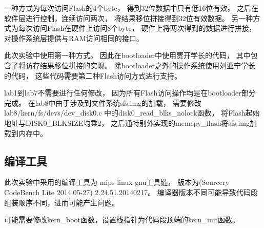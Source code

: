             一种方式为每次访问Flash的4个byte，%
            得到32位数据中只有低16位有效。%
            之后在软件层进行控制，连续访问两次，%
            将结果移位拼接得到32位有效数据。%
            另一种方式为每次访问Flash在硬件上访问8个byte，%
            硬件上将两次得到的数据进行拼接，%
            对操作系统层提供与RAM访问相同的接口。

            此次实验中使用第一种方式。%
            因此在bootloader中使用贾开学长的代码，%
            其中包含了将访存结果移位拼接的实现。%
            除bootloader之外的操作系统使用刘亚宁学长的代码，%
            这些代码需要第二种Flash访问方式进行支持。

            lab1到lab7不需要进行任何修改，%
            因为所有Flash访问操作均是在bootloader部分完成。%
            在lab8中由于涉及到文件系统sfs.img的加载，%
            需要修改lab8/kern/fs/devs/dev\_disk0.c%
            中的disk0\_read\_blks\_nolock函数，%
            将Flash起始地址与DISK0\_BLKSIZE均乘2，%
            之后通特别外实现的memcpy\_flash将sfs.img加载到内存中。

        \subsection{编译工具}
            此次实验中采用的编译工具为%
            mips-linux-gnu工具链，%
            版本为(Sourcery CodeBench Lite 2014.05-27)%
            2.24.51.20140217。%
            编译器版本不同可能导致代码段组装顺序不同，进而可能产生问题。%
    
            可能需要修改kern\_boot函数，设置栈指针为代码段顶端的kern\_init函数。
